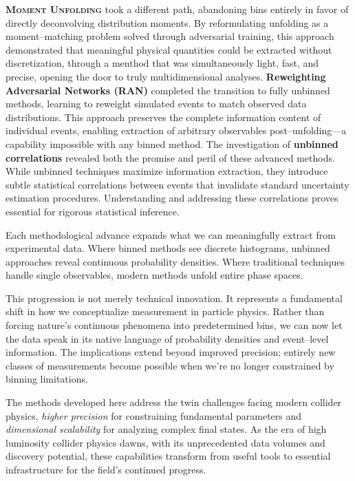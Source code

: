     \textbf{\textsc{Moment Unfolding}} took a different path, abandoning bins entirely in favor of directly deconvolving distribution moments.
    By reformulating unfolding as a moment--matching problem solved through adversarial training, this approach demonstrated that meaningful physical quantities could be extracted without discretization, through a menthod that was simultaneously light, fast, and precise, opening the door to truly multidimensional analyses.
    \textbf{Reweighting Adversarial Networks (RAN)} completed the transition to fully unbinned methods, learning to reweight simulated events to match observed data distributions.
    This approach preserves the complete information content of individual events, enabling extraction of arbitrary observables post--unfolding—a capability impossible with any binned method.
    The investigation of \textbf{unbinned correlations} revealed both the promise and peril of these advanced methods.
    While unbinned techniques maximize information extraction, they introduce subtle statistical correlations between events that invalidate standard uncertainty estimation procedures.
    Understanding and addressing these correlations proves essential for rigorous statistical inference.
    
    Each methodological advance expands what we can meaningfully extract from experimental data.
    Where binned methods see discrete histograms, unbinned approaches reveal continuous probability densities.
    Where traditional techniques handle single observables, modern methods unfold entire phase spaces.

    This progression is not merely technical innovation.
    It represents a fundamental shift in how we conceptualize measurement in particle physics.
    Rather than forcing nature's continuous phenomena into predetermined bins, we can now let the data speak in its native language of probability densities and event--level information.
    The implications extend beyond improved precision; entirely new classes of measurements become possible when we're no longer constrained by binning limitations.

    The methods developed here address the twin challenges facing modern collider physics, \emph{higher precision} for constraining fundamental parameters and \emph{dimensional scalability} for analyzing complex final states.
    As the era of high luminosity collider physics dawns, with its unprecedented data volumes and discovery potential, these capabilities transform from useful tools to essential infrastructure for the field's continued progress.

